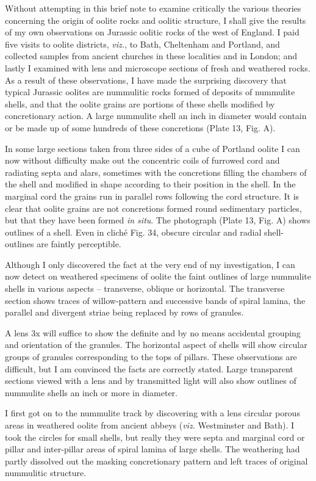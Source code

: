 \documentclass[a4paper, 12pt, oneside]{article}
\begin{document}
Without attempting in this brief note to examine critically the various theories concerning the origin of oolite rocks and oolitic structure, I shall give the results of my own observations on Jurassic oolitic rocks of the west of England. I paid five visits to oolite districts, \emph{viz.}, to Bath, Cheltenham and Portland, and collected samples from ancient churches in these localities and in London; and lastly I examined with lens and microscope sections of fresh and weathered rocks. As a result of these observations, I have made the surprising discovery that typical Jurassic oolites are nummulitic rocks formed of deposits of nummulite shells, and that the oolite grains are portions of these shells modified by concretionary action. A large nummulite shell an inch in diameter would contain or be made up of some hundreds of these concretions (Plate 13, Fig. A).

In some large sections taken from three sides of a cube of Portland oolite I can now without difficulty make out the concentric coils of furrowed cord and radiating septa and alars, sometimes with the concretions filling the chambers of the shell and modified in shape according to their position in the shell. In the marginal cord the grains run in parallel rows following the cord structure. It is clear that oolite grains are not concretions formed round sedimentary particles, but that they have been formed \emph{in situ}. The photograph (Plate 13, Fig. A) shows outlines of a shell. Even in cliché Fig. 34, obscure circular and radial shell-outlines are faintly perceptible.

Although I only discovered the fact at the very end of my investigation, I can now detect on weathered specimens of oolite the faint outlines of large nummulite shells in various aspects -- transverse, oblique or horizontal. The transverse section shows traces of willow-pattern and successive bands of spiral lamina, the parallel and divergent striae being replaced by rows of granules.

A lens 3x will suffice to show the definite and by no means accidental grouping and orientation of the granules. The horizontal aspect of shells will show circular groups of granules corresponding to the tops of pillars. These observations are difficult, but I am convinced the facts are correctly stated. Large transparent sections viewed with a lens and by transmitted light will also show outlines of nummulite shells an inch or more in diameter.

I first got on to the nummulite track by discovering with a lens circular porous areas in weathered oolite from ancient abbeys (\emph{viz.} Westminster and Bath). I took the circles for small shells, but really they were septa and marginal cord or pillar and inter-pillar areas of spiral lamina of large shells. The weathering had partly dissolved out the masking concretionary pattern and left traces of original nummulitic structure.
\end{document}
